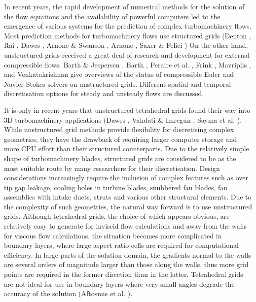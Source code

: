  In recent years, the rapid development of numerical methods for the solution
 of the flow equations and the availability of powerful computers 
 led to the emergence of various systems for the prediction of complex
 turbomachinery flows.
 Most  prediction methods for turbomachinery flows use structured
 grids (Denton , Rai ,
 Dawes ,
 Arnone \& Swanson , Arnone ,
 Saxer \& Felici )
 On the other hand, unstructured grids received a great deal of research
 and development for external compressible flows.
 Barth \& Jespersen \citeyear{Barth:1},
 Barth \citeyear{Barth:4,Barth:2,Barth:3},
 Peraire et al. \citeyear{Peiro:2},
 Frink \citeyear{Frink:2,Frink:1},
 Mavriplis \citeyear{Mavriplis:4},
 and Venkatakrishnan \citeyear{Venkata:1} give
 overviews of the status of compressible Euler and Navier-Stokes solvers on
 unstructured grids.
 Different spatial and temporal discretisation options
 for steady and unsteady flows are discussed.

 It is only in recent years that unstructured tetrahedral grids found
 their way into 3D turbomachinery applications
 (Dawes , Vahdati \& Imregun ,
 Sayma et al. ).
 While unstructured grid methods  provide  flexibility for discretising
 complex geometries, they have the drawback of requiring larger
 computer storage and more CPU effort than their structured counterparts.
 Due to the relatively simple shape of turbomachinery blades, structured grids
 are considered to be as the most suitable 
 route by many researchers for their discretisation.
 Design considerations increasingly require the inclusion of complex features
 such as over tip gap leakage, cooling holes in turbine blades,
 snubbered fan blades, fan assemblies with intake ducts, struts and various
 other structural elements. Due to the complexity of such geometries,
 the natural way forward is to use unstructured grids. 
 Although tetrahedral grids, the choice of which appears obvious,
 are relatively easy to generate for inviscid flow calculations and away
 from the walls for viscous flow calculations, the situation becomes more
 complicated in boundary layers, where large aspect ratio cells are
 required for computational efficiency.
 In large parts of the solution domain, the gradients normal to the walls
 are several orders of magnitude larger than those along the walls,
 thus more grid points are required  in the former direction than in the latter.
 Tetrahedral grids are not ideal for use in boundary
 layers where very small angles degrade the accuracy of the solution
 (Aftosmis et al. ).

